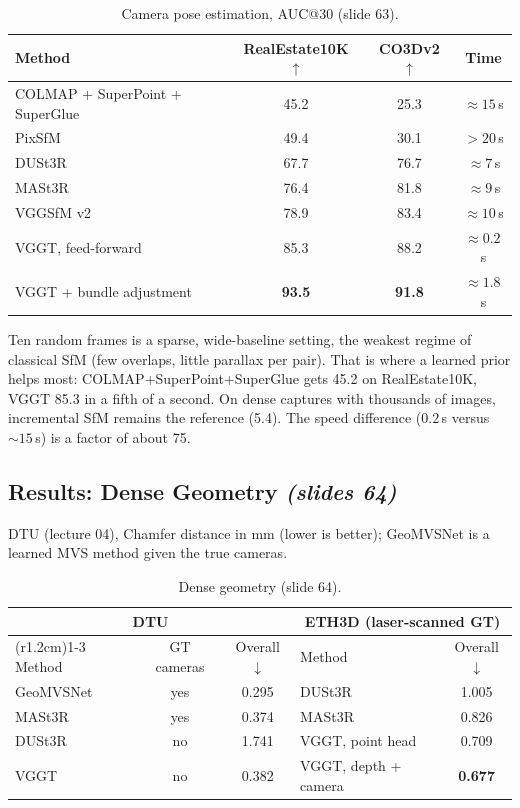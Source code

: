\documentclass[11pt,a4paper]{article}
\newcommand{\slr}[1]{\texorpdfstring{\emph{(slides #1)}}{(slides #1)}}
\theoremstyle{definition}
\theoremstyle{plain}
\theoremstyle{remark}
\begin{document}
\begin{table}[H]
\centering
\begin{tabular}{lccc}
\toprule
Method & RealEstate10K $\uparrow$ & CO3Dv2 $\uparrow$ & Time\\
\midrule
COLMAP + SuperPoint + SuperGlue & 45.2 & 25.3 & $\approx15$\,s\\
PixSfM & 49.4 & 30.1 & $>20$\,s\\
DUSt3R & 67.7 & 76.7 & $\approx7$\,s\\
MASt3R & 76.4 & 81.8 & $\approx9$\,s\\
VGGSfM v2 & 78.9 & 83.4 & $\approx10$\,s\\
VGGT, feed-forward & 85.3 & 88.2 & $\approx0.2$\,s\\
VGGT + bundle adjustment & \textbf{93.5} & \textbf{91.8} & $\approx1.8$\,s\\
\bottomrule
\end{tabular}
\caption{Camera pose estimation, AUC@30 (slide 63).}
\end{table}

\begin{intuition}
Ten random frames is a sparse, wide-baseline setting, the weakest regime of classical SfM (few overlaps, little parallax per pair). That is where a learned prior helps most: COLMAP+SuperPoint+SuperGlue gets 45.2 on RealEstate10K, VGGT 85.3 in a fifth of a second. On dense captures with thousands of images, incremental SfM remains the reference (5.4). The speed difference ($0.2$\,s versus $\sim15$\,s) is a factor of about 75.
\end{intuition}

\subsection{Results: Dense Geometry \slr{64}}
DTU (lecture 04), Chamfer distance in mm (lower is better); GeoMVSNet is a learned MVS method given the true cameras.

\begin{table}[H]
\centering
\begin{tabular}{@{}lcc@{\hspace{2.2cm}}lc@{}}
\toprule
\multicolumn{3}{c}{DTU} & \multicolumn{2}{c}{ETH3D (laser-scanned GT)}\\
\cmidrule(r{1.2cm}){1-3}\cmidrule{4-5}
Method & GT cameras & Overall$\downarrow$ & Method & Overall$\downarrow$\\
\midrule
GeoMVSNet & yes & 0.295 & DUSt3R & 1.005\\
MASt3R & yes & 0.374 & MASt3R & 0.826\\
DUSt3R & no & 1.741 & VGGT, point head & 0.709\\
VGGT & no & 0.382 & VGGT, depth + camera & \textbf{0.677}\\
\bottomrule
\end{tabular}
\caption{Dense geometry (slide 64).}
\end{table}
\end{document}
